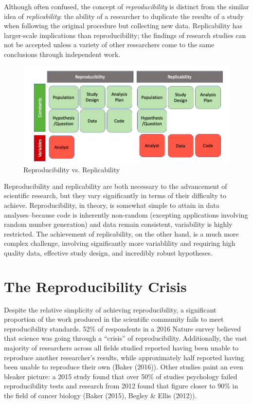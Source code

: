 \documentclass[12pt,twoside]{reedthesis}
\begin{document}
Although often confused, the concept of \emph{reproducibility} is distinct from the similar idea of \emph{replicability}: the ability of a researcher to duplicate the results of a study when following the original procedure but collecting new data. Replicability has larger-scale implications than reproducibility; the findings of research studies can not be accepted unless a variety of other researchers come to the same conclusions through independent work.
\begin{figure}

{\centering \includegraphics[width=1\linewidth]{figure/versus} 

}

\caption{Reproducibility vs. Replicability}\label{fig:unnamed-chunk-3}
\end{figure}
Reproducibility and replicability are both necessary to the advancement of scientific research, but they vary significantly in terms of their difficulty to achieve. Reproducibility, in theory, is somewhat simple to attain in data analyses--because code is inherently non-random (excepting applications involving random number generation) and data remain consistent, variability is highly restricted. The achievement of replicability, on the other hand, is a much more complex challenge, involving significantly more variablility and requiring high quality data, effective study design, and incredibly robust hypotheses.

\hypertarget{the-reproducibility-crisis}{%
\section{The Reproducibility Crisis}\label{the-reproducibility-crisis}}

Despite the relative simplicity of achieving reproducibility, a significant proportion of the work produced in the scientific community fails to meet reproducibility standards. 52\% of respondents in a 2016 Nature survey believed that science was going through a ``crisis'' of reproducibility. Additionally, the vast majority of researchers across all fields studied reported having been unable to reproduce another researcher's results, while approximately half reported having been unable to reproduce their own (Baker (2016)). Other studies paint an even bleaker picture: a 2015 study found that over 50\% of studies psychology failed reproducibility tests and research from 2012 found that figure closer to 90\% in the field of cancer biology (Baker (2015), Begley \& Ellis (2012)).
\end{document}
